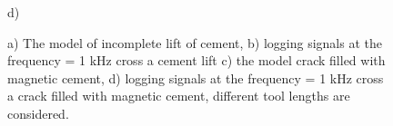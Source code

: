 \documentclass[10pt,twoside]{article}
\begin{document}
\begin{figure}[ht!]
\begin{minipage}[h]{0.26\linewidth}
 d) \\
\end{minipage}
\caption{a) The model of incomplete lift of cement, b)
logging signals at the frequency = 1 kHz cross a cement lift c) the model crack filled with magnetic cement, d) logging signals at the frequency = 1 kHz cross a crack filled with magnetic cement, different tool lengths are considered.}
\label{liftandcrack}
\end{figure}
\end{document}
